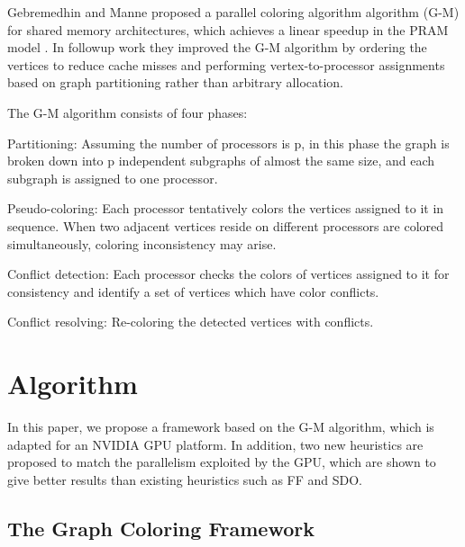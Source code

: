 \documentclass[preprint]{sigplanconf}
\newcommand{\gm}{G-M\xspace}
\begin{document}
Gebremedhin and Manne proposed a  parallel coloring algorithm algorithm (\gm) for shared memory architectures, which achieves a linear speedup in the PRAM model \cite{gebremedhin2000scalable}. In followup work \cite{gebremedhin2006speeding} they improved the \gm algorithm by ordering the vertices to reduce cache misses and performing vertex-to-processor assignments based on graph partitioning rather than arbitrary allocation. 

The \gm algorithm consists of four phases: 
\begin{inparaenum}[(1)]
  \item Partitioning: Assuming the number of processors is p, in this phase the graph is broken down into p independent subgraphs of almost the same size, and each subgraph is assigned to one processor. 
  \item Pseudo-coloring: Each processor tentatively colors the vertices assigned to it in sequence. When two adjacent vertices reside on different processors are colored simultaneously, coloring inconsistency may arise.
  \item Conflict detection:  Each processor checks the colors of  vertices assigned to it for consistency and identify a set of vertices which have color conflicts.
  \item Conflict resolving: Re-coloring the detected vertices with conflicts.
\end{inparaenum}


\section{Algorithm}

In this paper, we propose a framework based on the \gm algorithm, which is adapted for an NVIDIA GPU platform.  In addition, two new heuristics are proposed to match the parallelism exploited by the GPU, which are shown to give better results than existing heuristics such as FF and SDO. 

\subsection{The Graph Coloring Framework}
\end{document}
